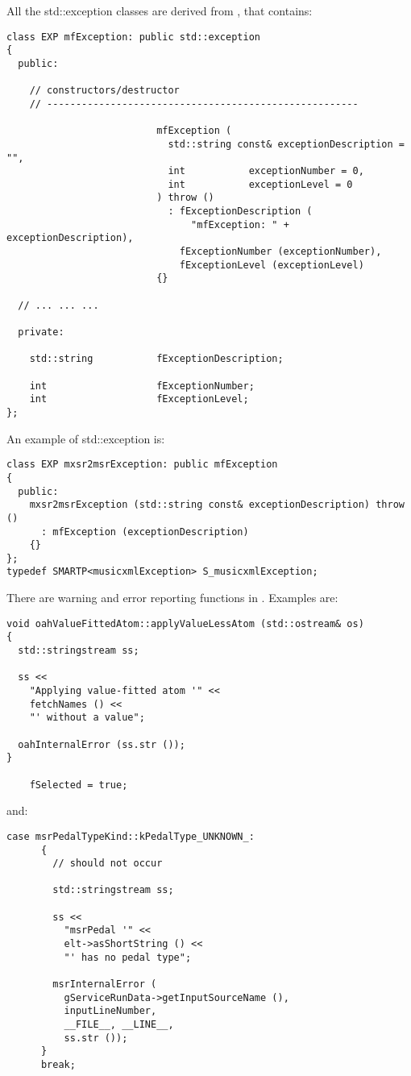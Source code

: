 All the std::exception classes are derived from {\tt }, that contains:
\begin{lstlisting}[language=CPlusPlus]
class EXP mfException: public std::exception
{
  public:

    // constructors/destructor
    // ------------------------------------------------------

                          mfException (
                            std::string const& exceptionDescription = "",
                            int           exceptionNumber = 0,
                            int           exceptionLevel = 0
                          ) throw ()
                            : fExceptionDescription (
                                "mfException: " + exceptionDescription),
                              fExceptionNumber (exceptionNumber),
                              fExceptionLevel (exceptionLevel)
                          {}

  // ... ... ...

  private:

    std::string           fExceptionDescription;

    int                   fExceptionNumber;
    int                   fExceptionLevel;
};
\end{lstlisting}

An example of std::exception is:
\begin{lstlisting}[language=CPlusPlus]
class EXP mxsr2msrException: public mfException
{
  public:
    mxsr2msrException (std::string const& exceptionDescription) throw ()
      : mfException (exceptionDescription)
    {}
};
typedef SMARTP<musicxmlException> S_musicxmlException;
\end{lstlisting}

There are warning and error reporting functions in .
Examples are:
\begin{lstlisting}[language=CPlusPlus]
void oahValueFittedAtom::applyValueLessAtom (std::ostream& os)
{
  std::stringstream ss;

  ss <<
    "Applying value-fitted atom '" <<
    fetchNames () <<
    "' without a value";

  oahInternalError (ss.str ());
}

	fSelected = true;
\end{lstlisting}

and:
\begin{lstlisting}[language=CPlusPlus]
    case msrPedalTypeKind::kPedalType_UNKNOWN_:
      {
        // should not occur

        std::stringstream ss;

        ss <<
          "msrPedal '" <<
          elt->asShortString () <<
          "' has no pedal type";

        msrInternalError (
          gServiceRunData->getInputSourceName (),
          inputLineNumber,
          __FILE__, __LINE__,
          ss.str ());
      }
      break;
\end{lstlisting}


